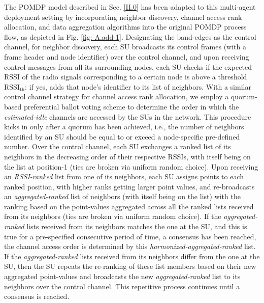 \documentclass[10pt, twocolumn]{IEEEtran}
\begin{document}
The POMDP model described in Sec. \ref{II.0} has been adapted to this multi-agent deployment setting by incorporating neighbor discovery, channel access rank allocation, and data aggregation algorithms into the original POMDP process flow, as depicted in Fig. \ref{fig: A.add-1}. Designating the band-edges as the control channel, for neighbor discovery, each SU broadcasts its control frames (with a frame header and node identifier) over the control channel, and upon receiving control messages from all its surrounding nodes, each SU checks if the expected RSSI of the radio signals corresponding to a certain node is above a threshold $\text{RSSI}_\text{th}$: if yes, adds that node’s identifier to its list of neighbors. With a similar control channel strategy for channel access rank allocation, we employ a quorum-based preferential ballot voting scheme to determine the order in which the \emph{estimated-idle} channels are accessed by the SUs in the network. This procedure kicks in only after a quorum has been achieved, i.e., the number of neighbors identified by an SU should be equal to or exceed a node-specific pre-defined number. Over the control channel, each SU exchanges a ranked list of its neighbors in the decreasing order of their respective  RSSIs, with itself being on the list at position-1 (ties are broken via uniform random choice). Upon receiving an \emph{RSSI-ranked} list from one of its neighbors, each SU assigns points to each ranked position, with higher ranks getting larger point values, and re-broadcasts an \emph{aggregated-ranked} list of neighbors (with itself being on the list) with the ranking based on the point-values aggregated across all the ranked lists received from its neighbors (ties are broken via uniform random choice). If the \emph{aggregated-ranked} lists received from its neighbors matches the one at the SU, and this is true for a pre-specified consecutive period of time, a consensus has been reached, the channel access order is determined by this \emph{harmonized-aggregated-ranked} list. If the \emph{aggregated-ranked} lists received from its neighbors differ from the one at the SU, then  the SU repeats the re-ranking of these list members based on their new aggregated point-values and broadcasts the new \emph{aggregated-ranked} list to its neighbors over the control channel. This repetitive process continues until a consensus is reached.
\end{document}
